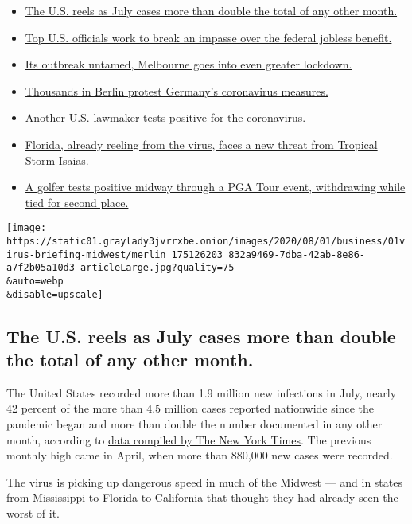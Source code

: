\begin{itemize}
\tightlist
\item
  \protect\hyperlink{link-34047410}{The U.S. reels as July cases more
  than double the total of any other month.}
\item
  \protect\hyperlink{link-780ec966}{Top U.S. officials work to break an
  impasse over the federal jobless benefit.}
\item
  \protect\hyperlink{link-2bc8948}{Its outbreak untamed, Melbourne goes
  into even greater lockdown.}
\item
  \protect\hyperlink{link-25930521}{Thousands in Berlin protest
  Germany's coronavirus measures.}
\item
  \protect\hyperlink{link-71e54361}{Another U.S. lawmaker tests positive
  for the coronavirus.}
\item
  \protect\hyperlink{link-1e0cb5f3}{Florida, already reeling from the
  virus, faces a new threat from Tropical Storm Isaias.}
\item
  \protect\hyperlink{link-45c905e3}{A golfer tests positive midway
  through a PGA Tour event, withdrawing while tied for second place.}
\end{itemize}

\texttt{[image: https://static01.graylady3jvrrxbe.onion/images/2020/08/01/business/01virus-briefing-midwest/merlin\_175126203\_832a9469-7dba-42ab-8e86-a7f2b05a10d3-articleLarge.jpg?quality=75\\\&auto=webp\\\&disable=upscale]}

\hypertarget{the-us-reels-as-july-cases-more-than-double-the-total-of-any-other-month}{%
\subsection{The U.S. reels as July cases more than double the total of
any other
month.}\label{the-us-reels-as-july-cases-more-than-double-the-total-of-any-other-month}}

The United States recorded more than 1.9 million new infections in July,
nearly 42 percent of the more than 4.5 million cases reported nationwide
since the pandemic began and more than double the number documented in
any other month, according to
\href{https://www.nytimes3xbfgragh.onion/interactive/2020/us/coronavirus-us-cases.html?action=click\&module=Top\%20Stories\&pgtype=Homepage\#map}{data
compiled by The New York Times}. The previous monthly high came in
April, when more than 880,000 new cases were recorded.

The virus is picking up dangerous speed in much of the Midwest --- and
in states from Mississippi to Florida to California that thought they
had already seen the worst of it.

